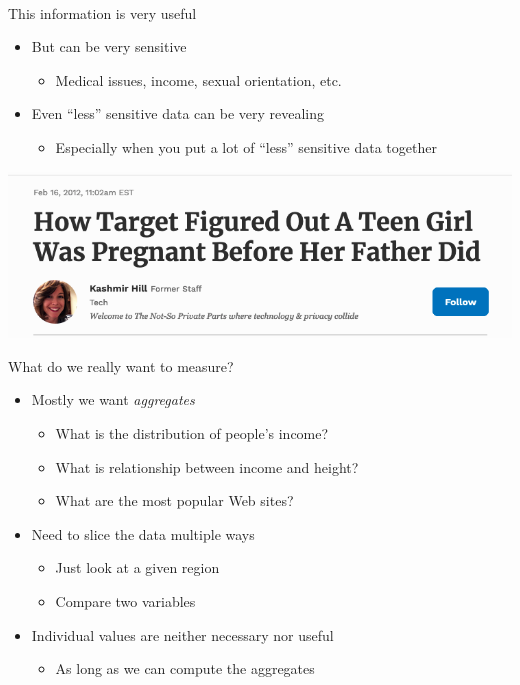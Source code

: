 \documentclass[helvetica]{beamer}
\begin{document}
\begin{frame}{This information is very useful}

  \begin{itemize}
    \item But can be very sensitive
    \begin{itemize}
    \item Medical issues, income, sexual orientation, etc.
    \end{itemize}
  \item Even ``less'' sensitive data can be very revealing
    \begin{itemize}
    \item Especially when you put a lot of ``less'' sensitive data together      
    \end{itemize}
  \end{itemize}


  \includegraphics[scale=.3]{target-pregnancy.png}
\end{frame}


\begin{frame}{What do we really want to measure?}

  \begin{itemize}
  \item Mostly we want \emph{aggregates}
    \begin{itemize}
     \item What is the distribution of people's income?
     \item What is relationship between income and height?
     \item What are the most popular Web sites?
    \end{itemize}
  \item Need to slice the data multiple ways
    \begin{itemize}
    \item Just look at a given region
    \item Compare two variables
    \end{itemize}
  \item Individual values are neither necessary nor useful
    \begin{itemize}
    \item As long as we can compute the aggregates      
    \end{itemize}    
  \end{itemize} 
\end{frame}
\end{document}
